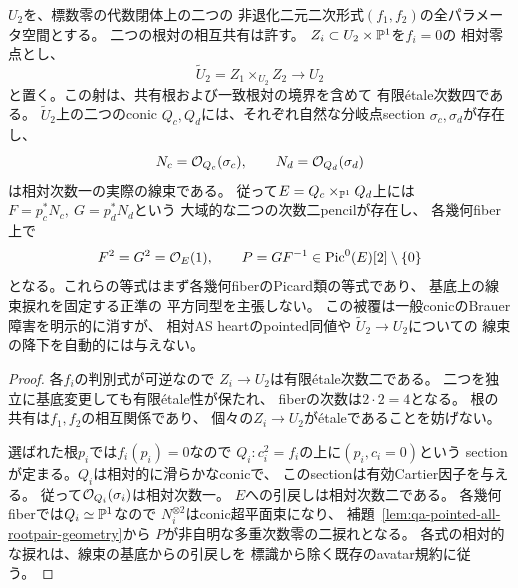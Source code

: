 \begin{corollary}
\label{cor:qa-root-choice-etale-splitting}
$U_2$を、標数零の代数閉体上の二つの
非退化二元二次形式$(f_1,f_2)$の全パラメータ空間とする。
二つの根対の相互共有は許す。
$Z_i\subset U_2\times\mathbb P^1$を$f_i=0$の
相対零点とし、
\[
 \widetilde U_2=Z_1\times_{U_2}Z_2
       \longrightarrow U_2
 \tag{Root-choice-cover}\label{eq:qa-root-choice-four-cover}
\]
と置く。この射は、共有根および一致根対の境界を含めて
有限\'{e}tale次数四である。
$\widetilde U_2$上の二つのconic
$Q_c,Q_d$には、それぞれ自然な分岐点section
$\sigma_c,\sigma_d$が存在し、
\[
 N_c=\mathcal O_{Q_c}(\sigma_c),\qquad
 N_d=\mathcal O_{Q_d}(\sigma_d)
\]
は相対次数一の実際の線束である。
従って$E=Q_c\times_{\mathbb P^1}Q_d$上には
$F=p_c^*N_c,\ G=p_d^*N_d$という
大域的な二つの次数二pencilが存在し、
各幾何fiber上で
\[
 F^2=G^2=\mathcal O_E(1),\qquad
 P=GF^{-1}\in\operatorname{Pic}^0(E)[2]\setminus\{0\}
\]
となる。これらの等式はまず各幾何fiberのPicard類の等式であり、
基底上の線束捩れを固定する正準の
平方同型を主張しない。
この被覆は一般conicのBrauer障害を明示的に消すが、
相対AS heartのpointed同値や
$\widetilde U_2\to U_2$についての
線束の降下を自動的には与えない。
\end{corollary}
\begin{proof}
各$f_i$の判別式が可逆なので
$Z_i\to U_2$は有限\'{e}tale次数二である。
二つを独立に基底変更しても有限\'{e}tale性が保たれ、
fiberの次数は$2\cdot2=4$となる。
根の共有は$f_1,f_2$の相互関係であり、
個々の$Z_i\to U_2$が\'{e}taleであることを妨げない。

選ばれた根$p_i$では$f_i(p_i)=0$なので
$Q_i:c_i^2=f_i$の上に$(p_i,c_i=0)$という
sectionが定まる。$Q_i$は相対的に滑らかなconicで、
このsectionは有効Cartier因子を与える。
従って$\mathcal O_{Q_i}(\sigma_i)$は相対次数一。
$E$への引戻しは相対次数二である。
各幾何fiberでは$Q_i\simeq\mathbb P^1$なので
$N_i^{\otimes2}$はconic超平面束になり、
補題~\ref{lem:qa-pointed-all-rootpair-geometry}から
$P$が非自明な多重次数零の二捩れとなる。
各式の相対的な捩れは、線束の基底からの引戻しを
標識から除く既存のavatar規約に従う。
\end{proof}

